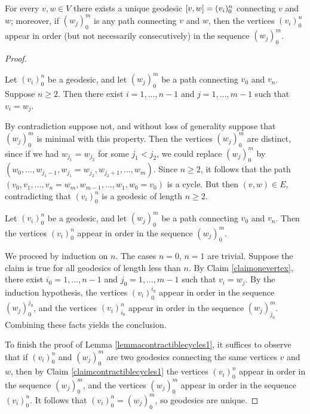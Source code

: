 \begin{lemma}
\label{lemmacontractiblecycles1}
For every $v,w\in V$ there exists a unique geodesic $[v,w] = (v_i)_0^n$ connecting $v$ and $w$; moreover, if $(w_j)_0^m$ is any path connecting $v$ and $w$, then the vertices $(v_i)_0^n$ appear in order (but not necessarily consecutively) in the sequence $(w_j)_0^m$.
\end{lemma}
\begin{proof}
\begin{claim}
\label{claimonevertex}
Let $(v_i)_0^n$ be a geodesic, and let $(w_j)_0^m$ be a path connecting $v_0$ and $v_n$. Suppose $n\geq 2$. Then there exist $i = 1,\ldots,n - 1$ and $j = 1,\ldots,m - 1$ such that $v_i = w_j$.
\end{claim}
\begin{subproof}
By contradiction suppose not, and without loss of generality suppose that $(w_j)_0^m$ is minimal with this property. Then the vertices $(w_j)_0^m$ are distinct, since if we had $w_{j_1} = w_{j_2}$ for some $j_1 < j_2$, we could replace $(w_j)_0^m$ by $(w_0,\ldots,w_{j_1 - 1},w_{j_1} = w_{j_2},w_{j_2 + 1},\ldots,w_m)$. Since $n\geq 2$, it follows that the path $(v_0,v_1,\ldots,v_n = w_m,w_{m - 1},\ldots,w_1,w_0 = v_0)$ is a cycle. But then $(v,w)\in E$, contradicting that $(v_i)_0^n$ is a geodesic of length $n\geq 2$.
\end{subproof}
\begin{claim}
\label{claimcontractiblecycles1}
Let $(v_i)_0^n$ be a geodesic, and let $(w_j)_0^m$ be a path connecting $v_0$ and $v_n$. Then the vertices $(v_i)_0^n$ appear in order in the sequence $(w_j)_0^m$.
\end{claim}
\begin{subproof}
We proceed by induction on $n$. The cases $n = 0$, $n = 1$ are trivial. Suppose the claim is true for all geodesics of length less than $n$. By Claim \ref{claimonevertex}, there exist $i_0 = 1,\ldots,n - 1$ and $j_0 = 1,\ldots,m - 1$ such that $v_i = w_j$. By the induction hypothesis, the vertices $(v_i)_0^{i_0}$ appear in order in the sequence $(w_j)_0^{j_0}$, and the vertices $(v_i)_{i_0}^n$ appear in order in the sequence $(w_j)_{j_0}^m$. Combining these facts yields the conclusion.
\end{subproof}
To finish the proof of Lemma \ref{lemmacontractiblecycles1}, it suffices to observe that if $(v_i)_0^n$ and $(w_j)_0^m$ are two geodesics connecting the same vertices $v$ and $w$, then by Claim \ref{claimcontractiblecycles1} the vertices $(v_i)_0^n$ appear in order in the sequence $(w_j)_0^m$, and the vertices $(w_j)_0^m$ appear in order in the sequence $(v_i)_0^n$. It follows that $(v_i)_0^n = (w_j)_0^m$, so geodesics are unique.
\end{proof}


